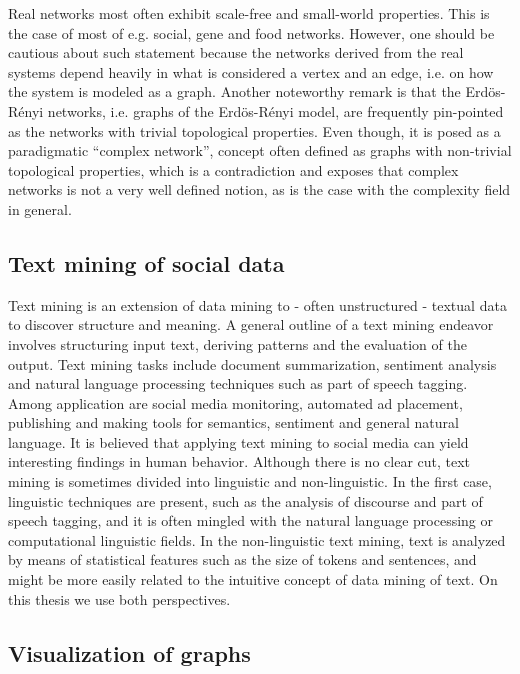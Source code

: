Real networks most often exhibit scale-free and small-world properties.
This is the case of most of e.g. social, gene and food networks.
However, one should be cautious about such statement because
the networks derived from the real systems depend heavily
in what is considered a vertex and an edge,
i.e. on how the system is modeled as a graph.
Another noteworthy remark is that
the Erdös-Rényi networks, i.e. graphs of the Erdös-Rényi model, are frequently pin-pointed as the networks with trivial
topological properties.
Even though, it is posed as a paradigmatic ``complex network'', concept often defined as graphs with non-trivial topological properties,
which is a contradiction and exposes that complex networks is not a very well defined notion,
as is the case with the complexity field in general.

\subsection{Text mining of social data}
Text mining is an extension of data mining to - often unstructured - textual data
to discover structure and meaning.
A general outline of a text mining endeavor involves structuring input text,
deriving patterns and the evaluation of the output.
Text mining tasks include document summarization, sentiment analysis
and natural language processing techniques such as part of speech tagging.
Among application are social media monitoring, automated ad placement,
publishing and making tools for semantics, sentiment and general natural language.
It is believed that applying text mining to social media
can yield interesting findings in human behavior.
Although there is no clear cut, text mining is sometimes divided into linguistic and non-linguistic.
In the first case, linguistic techniques are present, such as
the analysis of discourse and part of speech tagging,
and it is often mingled with the natural language processing or computational linguistic fields.
In the non-linguistic text mining, text is analyzed by means of statistical features
such as the size of tokens and sentences, and might be more easily related to the intuitive concept of data mining of text.
On this thesis we use both perspectives.

\subsection{Visualization of graphs}
